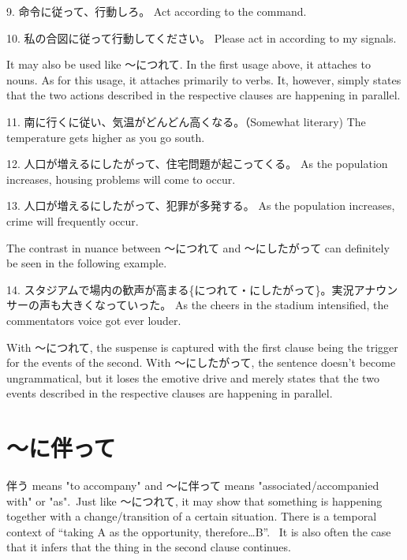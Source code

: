 \par{9. 命令に従って、行動しろ。 \hfill\break
Act according to the command. }

\par{10. 私の合図に従って行動してください。 \hfill\break
Please act in according to my signals. }

\par{ It may also be used like ～につれて. In the first usage above, it attaches to nouns. As for this usage, it attaches primarily to verbs. It, however, simply states that the two actions described in the respective clauses are happening in parallel. }

\par{11. 南に行くに従い、気温がどんどん高くなる。（Somewhat literary) \hfill\break
The temperature gets higher as you go south. }

\par{12. 人口が増えるにしたがって、住宅問題が起こってくる。 \hfill\break
As the population increases, housing problems will come to occur. }

\par{13. 人口が増えるにしたがって、犯罪が多発する。 \hfill\break
As the population increases, crime will frequently occur. }

\par{ The contrast in nuance between ～につれて and ～にしたがって can definitely be seen in the following example. }

\par{14. スタジアムで場内の歓声が高まる\{につれて・にしたがって\}。実況アナウンサーの声も大きくなっていった。 \hfill\break
As the cheers in the stadium intensified, the commentator\textquotesingle s voice got ever louder. }

\par{ With ～につれて, the suspense is captured with the first clause being the trigger for the events of the second. With ～にしたがって, the sentence doesn't become ungrammatical, but it loses the emotive drive and merely states that the two events described in the respective clauses are happening in parallel. }
      
\section{～に伴って}
 
\par{ 伴う means "to accompany" and ～に伴って means "associated\slash accompanied with" or "as". Just like ～につれて, it may show that something is happening together with a change\slash transition of a certain situation. There is a temporal context of “taking A as the opportunity, therefore…B”.  It is also often the case that it infers that the thing in the second clause continues. }


